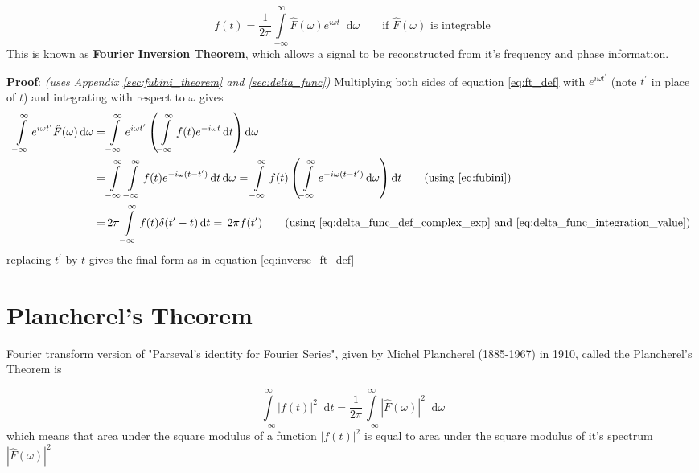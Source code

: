 \documentclass[11pt, a4paper]{article}
\let\oldsection\section
\renewcommand{\section}{%
	\setcounter{equation}{0}%
	\oldsection%
}
\newcommand{\eqrefnp}[1]{\textup{\ref{#1}}}
\newcommand{\primed}[1]{#1^{\prime}}
\newcommand{\tp}{\primed{t}}	%
\newcommand{\diff}{\mathop{}\!\mathrm{d}}
\newcommand{\dt}{\diff t}
\newcommand{\domega}{\diff \omega}
\newcommand{\dint}[2]{\int \limits_{#1}^{#2}}  %
\newcommand{\intinfty}{\dint{-\infty}{\infty}}	%
\newcommand{\iintinfty}{\intinfty \intinfty}	%
\begin{document}
\begin{equation}\label{eq:inverse_ft_def}
	\boxed{
		f(t) = \frac{1}{2\pi} \intinfty \hat{F}(\omega)e^{i\omega t} \domega
	} \qquad \text{if $\hat{F}(\omega)$ is integrable}
\end{equation}
This is known as \textbf{Fourier Inversion Theorem}, which allows a signal to be reconstructed from it's frequency and phase information. \cite{herman2016fourieranalysis}

\vspace{4pt}
\textbf{Proof}: \textit{(uses Appendix \ref{sec:fubini_theorem} and \ref{sec:delta_func})} Multiplying both sides of equation \eqref{eq:ft_def} with $e^{i\omega \tp}$ (note $\tp$ in place of $t$) and integrating with respect to $\omega$ gives
\begin{align*}
	\intinfty e^{i\omega \tp} \hat{F}(\omega) \domega 
	= & \intinfty e^{i\omega \tp} \left(\intinfty f(t) e^{-i\omega t} \dt \right) \domega \\
	= & \iintinfty f(t) e^{-i\omega (t - \tp)} \dt \domega
	= \intinfty f(t) \left(\intinfty  e^{-i\omega (t - \tp)} \domega \right) \dt \tag{using \eqrefnp{eq:fubini}} \\
	= & \, 2 \pi \intinfty f(t) \delta (\tp - t) \dt = \, 2 \pi f(\tp) \tag{using \eqrefnp{eq:delta_func_def_complex_exp} and \eqrefnp{eq:delta_func_integration_value}}
\end{align*} 
replacing $\tp$ by $t$ gives the final form as in equation \eqref{eq:inverse_ft_def}

\section{Plancherel's Theorem}\label{sec:plancherel_theorem}
Fourier transform version of "Parseval's identity for Fourier Series", given by Michel Plancherel (1885-1967) in 1910, called the Plancherel's Theorem is \cite{herman2016fourieranalysis}

\begin{equation}\label{eq:plancherel_theorem}
	\intinfty |f(t)|^{2} \dt = \frac{1}{2 \pi} \intinfty |\hat{F}(\omega)|^{2} \domega
\end{equation}
which means that area under the square modulus of a function $|f(t)|^{2}$ is equal to area under the square modulus of it's spectrum $|\hat{F}(\omega)|^{2}$
\end{document}
